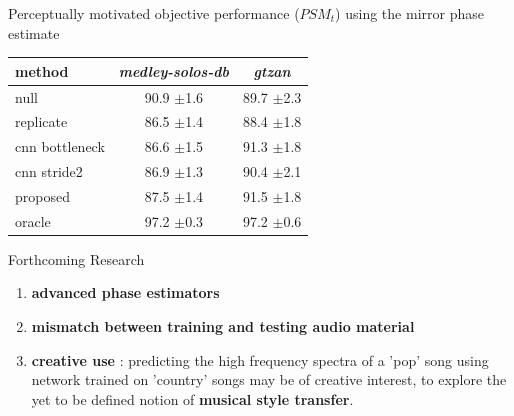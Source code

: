 \documentclass[compress]{beamer}
\begin{document}
\begin{frame}{Perceptually motivated objective performance ($PSM_t$) using the mirror phase estimate}
  \begin{center}
  \begin{tabular}{lcc}
  method & \textit{medley-solos-db} & \textit{gtzan} \\
  \hline
  null & 90.9 $\pm$1.6 & 89.7 $\pm$2.3  \\
  replicate & 86.5 $\pm$1.4 & 88.4 $\pm$1.8 \\
  \hline
  cnn bottleneck & 86.6 $\pm$1.5 & 91.3 $\pm$1.8 \\
  cnn stride2 & 86.9 $\pm$1.3 & 90.4 $\pm$2.1 \\
  \hline
  proposed & 87.5 $\pm$1.4 & 91.5 $\pm$1.8 \\
  \hline
  oracle & 97.2 $\pm$0.3 & 97.2 $\pm$0.6 \\
\end{tabular}
  \end{center}
\end{frame}

\begin{frame}{Forthcoming Research}
\begin{enumerate}
  \item \textbf{advanced phase estimators}
  \item \textbf{mismatch between training and testing audio material}
  \item \textbf{creative use} : predicting the high frequency spectra of a 'pop' song using network trained on 'country' songs may be of creative interest, to explore the yet to be defined notion of \textbf{musical style transfer}.
\end{enumerate}
\end{frame}

% 
\end{document}
